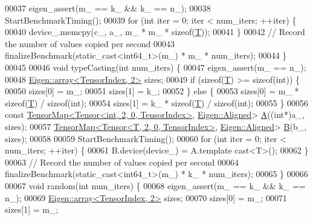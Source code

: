 \begin{DoxyCode}
00037     eigen\_assert(m\_ == k\_ && k\_ == n\_);
00038     StartBenchmarkTiming();
00039     \textcolor{keywordflow}{for} (\textcolor{keywordtype}{int} iter = 0; iter < num\_iters; ++iter) \{
00040       device\_.memcpy(c\_, a\_, m\_ * m\_ * \textcolor{keyword}{sizeof}(\hyperlink{group___sparse_core___module}{T}));
00041     \}
00042     \textcolor{comment}{// Record the number of values copied per second}
00043     finalizeBenchmark(static\_cast<int64\_t>(m\_) * m\_ * num\_iters);
00044   \}
00045 
00046   \textcolor{keywordtype}{void} typeCasting(\textcolor{keywordtype}{int} num\_iters) \{
00047     eigen\_assert(m\_ == n\_);
00048     \hyperlink{class_eigen_1_1array}{Eigen::array<TensorIndex, 2>} sizes;
00049     \textcolor{keywordflow}{if} (\textcolor{keyword}{sizeof}(\hyperlink{group___sparse_core___module}{T}) >= \textcolor{keyword}{sizeof}(\textcolor{keywordtype}{int})) \{
00050       sizes[0] = m\_;
00051       sizes[1] = k\_;
00052     \} \textcolor{keywordflow}{else} \{
00053       sizes[0] = m\_ * \textcolor{keyword}{sizeof}(\hyperlink{group___sparse_core___module}{T}) / \textcolor{keyword}{sizeof}(\textcolor{keywordtype}{int});
00054       sizes[1] = k\_ * \textcolor{keyword}{sizeof}(\hyperlink{group___sparse_core___module}{T}) / \textcolor{keyword}{sizeof}(\textcolor{keywordtype}{int});
00055     \}
00056     \textcolor{keyword}{const} \hyperlink{class_eigen_1_1_tensor_map}{TensorMap<Tensor<int, 2, 0, TensorIndex>}, 
      \hyperlink{group__enums_gga45fe06e29902b7a2773de05ba27b47a1ad37d4c71425bb286e9b4103830538fbf}{Eigen::Aligned}> \hyperlink{group___core___module_class_eigen_1_1_matrix}{A}((\textcolor{keywordtype}{int}*)a\_, sizes);
00057     \hyperlink{class_eigen_1_1_tensor_map}{TensorMap<Tensor<T, 2, 0, TensorIndex>}, 
      \hyperlink{group__enums_gga45fe06e29902b7a2773de05ba27b47a1ad37d4c71425bb286e9b4103830538fbf}{Eigen::Aligned}> \hyperlink{group___core___module_class_eigen_1_1_matrix}{B}(b\_, sizes);
00058 
00059     StartBenchmarkTiming();
00060     \textcolor{keywordflow}{for} (\textcolor{keywordtype}{int} iter = 0; iter < num\_iters; ++iter) \{
00061       B.device(device\_) = A.template cast<T>();
00062     \}
00063     \textcolor{comment}{// Record the number of values copied per second}
00064     finalizeBenchmark(static\_cast<int64\_t>(m\_) * k\_ * num\_iters);
00065   \}
00066 
00067   \textcolor{keywordtype}{void} random(\textcolor{keywordtype}{int} num\_iters) \{
00068     eigen\_assert(m\_ == k\_ && k\_ == n\_);
00069     \hyperlink{class_eigen_1_1array}{Eigen::array<TensorIndex, 2>} sizes;
00070     sizes[0] = m\_;
00071     sizes[1] = m\_;

\end{DoxyCode}
